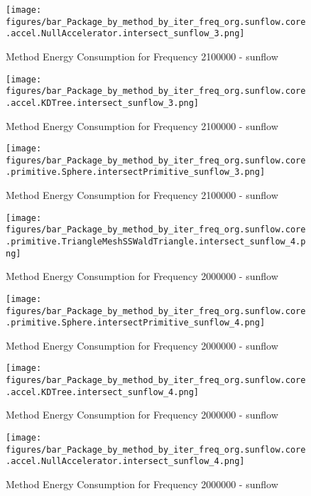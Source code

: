 				\begin{figure}[H]
				\centering
				\texttt{[image: figures/bar\_Package\_by\_method\_by\_iter\_freq\_org.sunflow.core.accel.NullAccelerator.intersect\_sunflow\_3.png]}
				\caption{Method Energy Consumption for Frequency 2100000 - sunflow}				
				\end{figure}				
				
				\begin{figure}[H]
				\centering
				\texttt{[image: figures/bar\_Package\_by\_method\_by\_iter\_freq\_org.sunflow.core.accel.KDTree.intersect\_sunflow\_3.png]}
				\caption{Method Energy Consumption for Frequency 2100000 - sunflow}				
				\end{figure}				
				
				\begin{figure}[H]
				\centering
				\texttt{[image: figures/bar\_Package\_by\_method\_by\_iter\_freq\_org.sunflow.core.primitive.Sphere.intersectPrimitive\_sunflow\_3.png]}
				\caption{Method Energy Consumption for Frequency 2100000 - sunflow}				
				\end{figure}				
				
				\begin{figure}[H]
				\centering
				\texttt{[image: figures/bar\_Package\_by\_method\_by\_iter\_freq\_org.sunflow.core.primitive.TriangleMeshSSWaldTriangle.intersect\_sunflow\_4.png]}
				\caption{Method Energy Consumption for Frequency 2000000 - sunflow}				
				\end{figure}				
				
				\begin{figure}[H]
				\centering
				\texttt{[image: figures/bar\_Package\_by\_method\_by\_iter\_freq\_org.sunflow.core.primitive.Sphere.intersectPrimitive\_sunflow\_4.png]}
				\caption{Method Energy Consumption for Frequency 2000000 - sunflow}				
				\end{figure}				
				
				\begin{figure}[H]
				\centering
				\texttt{[image: figures/bar\_Package\_by\_method\_by\_iter\_freq\_org.sunflow.core.accel.KDTree.intersect\_sunflow\_4.png]}
				\caption{Method Energy Consumption for Frequency 2000000 - sunflow}				
				\end{figure}				
				
				\begin{figure}[H]
				\centering
				\texttt{[image: figures/bar\_Package\_by\_method\_by\_iter\_freq\_org.sunflow.core.accel.NullAccelerator.intersect\_sunflow\_4.png]}
				\caption{Method Energy Consumption for Frequency 2000000 - sunflow}				
				\end{figure}				
				
